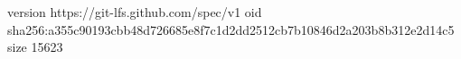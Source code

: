 version https://git-lfs.github.com/spec/v1
oid sha256:a355c90193cbb48d726685e8f7c1d2dd2512cb7b10846d2a203b8b312e2d14c5
size 15623
